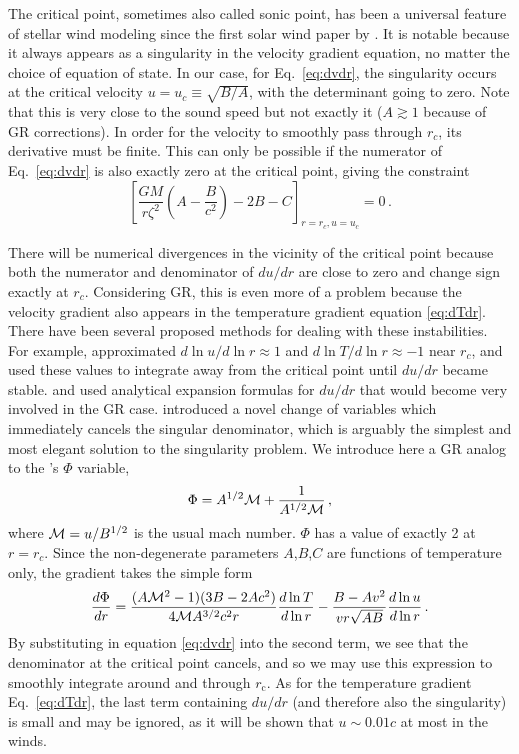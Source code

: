 \documentclass[../main.tex]{subfiles}
\begin{document}
The critical point, sometimes also called sonic point, has been a universal feature of stellar wind modeling since the first solar wind paper by \citet{Parker1958}. It is notable because it always appears as a singularity in the velocity gradient equation, no matter the choice of equation of state. In our case, for Eq.~\eqref{eq:dvdr}, the singularity occurs at the critical velocity $u=u_c\equiv \sqrt{B/A}$, with the determinant going to zero. Note that this is very close to the sound speed but not exactly it ($A\gtrsim 1$ because of GR corrections). In order for the velocity to smoothly pass through $r_c$, its derivative must be finite. This can only be possible if the numerator of Eq.~\eqref{eq:dvdr} is also exactly zero at the critical point, giving the constraint
\begin{equation}\label{eq:regularity_constraint}
    \left[\frac{GM}{r\zeta^2}\left(A-\frac{B}{c^2}\right)-2B-C\right]_{r=r_c,u=u_c}=0 \,.
\end{equation}

There will be numerical divergences in the vicinity of the critical point because both the numerator and denominator of $du/dr$ are close to zero and change sign exactly at $r_c$. Considering GR, this is even more of a problem because the velocity gradient also appears in the temperature gradient equation \eqref{eq:dTdr}. There have been several proposed methods for dealing with these instabilities. For example, \citet{Paczynski1986b} approximated $d\ln u/d\ln r\approx 1$ and $d\ln T/d\ln r\approx -1$ near $r_c$, and used these values to integrate away from the critical point until $du/dr$ became stable. \citet{Zytkow1972,Kato1983a} and \citet{Quinn1985} used analytical expansion formulas for $du/dr$ that would become very involved in the GR case. \citet{Joss1987} introduced a novel change of variables which immediately cancels the singular denominator, which is arguably the simplest and most elegant solution to the singularity problem. We introduce here a GR analog to the \citet{Joss1987}'s $\Phi$ variable,
\begin{equation}
    \label{eq:phi}
    \Phi=A^{1/2}\mathcal{M}+\frac{1}{A^{1/2}\mathcal{M}}\,,
\end{equation}
where $\mathcal{M}=u/B^{1/2}$ is the usual mach number. $\Phi$ has a value of exactly 2 at $r=r_c$.  Since the non-degenerate parameters $A$,$B$,$C$ are functions of temperature only, the gradient takes the simple form
\begin{equation}
    \frac{d\Phi}{dr}=\frac{(A\mathcal{M}^2-1)(3B-2Ac^2)}{4\mathcal{M} A^{3/2}c^2r}
    \frac{d\ln T}{d\ln r}
    -\frac{B-Av^2}{vr\sqrt{AB}}\frac{d\ln u}{d\ln r}\,.
    \label{eq:dphidr}
\end{equation}
By substituting in equation \eqref{eq:dvdr} into the second term, we see that the denominator at the critical point cancels, and so we may use this expression to smoothly integrate around and through $r_\text{c}$.  As for the temperature gradient Eq.~\eqref{eq:dTdr}, the last term containing $du/dr$ (and therefore also the singularity) is small and may be ignored, as it will be shown that $u\sim 0.01c$ at most in the winds.
\end{document}
